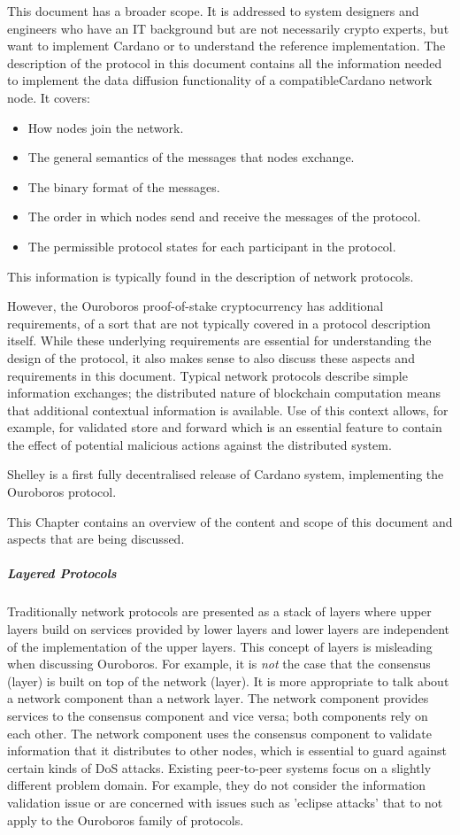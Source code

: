 \documentclass{report}
\newcommand{\wip}[1]{\color{magenta}{#1}\color{black}}
\theoremstyle{definition}{
  \newtheorem{lemma}{Lemma}[section] %
  \newtheorem{definition}[lemma]{Definition}
}
\theoremstyle{theorem}{
  \newtheorem{invariant}[lemma]{Invariant}
  \newtheorem{proofobligation}[lemma]{Proof Obligation}
}
\numberwithin{equation}{lemma}
\begin{document}
This document has a broader scope.
It is addressed to system designers and engineers who have an IT background
but are not necessarily crypto experts,
but want to implement Cardano or to understand the reference implementation.
The description of the protocol in this document contains all the information needed to
implement the data diffusion functionality of a compatibleCardano network node.
It covers:
\begin{itemize}
\item How nodes join the network.
\item The general semantics of the messages that nodes exchange.
\item The binary format of the messages.
\item The order in which nodes send and receive the messages of the protocol.
\item The permissible protocol states for each participant in the protocol.
\end{itemize}
This information is typically found in the description of network protocols.

However, the Ouroboros proof-of-stake cryptocurrency has additional requirements,
of a sort that are not typically covered in a
protocol  description itself.
While these underlying requirements are essential for understanding the design of the protocol,
it also makes sense to also discuss these aspects and requirements in this document.
Typical network protocols describe simple information exchanges;
the distributed nature of blockchain computation means
that additional contextual information is available.
Use of this context allows, for example, for validated store and forward
which is an essential feature to contain the effect of potential malicious actions
against the distributed system.

Shelley is a first fully decentralised release of Cardano system, implementing the Ouroboros protocol.

This Chapter contains an overview of the content and scope of this document and aspects that
are being discussed.

\wip{
\subparagraph{Software assurance}
Software assurance
}

\subparagraph{Layered Protocols}
Traditionally network protocols are presented as a stack of layers where
upper layers build on services provided by lower layers and lower layers
are independent of the implementation of the upper layers.
This concept of layers is misleading when discussing Ouroboros.
For example, it is {\em not} the case that the consensus (layer)
is built on top of the network (layer).
It is more appropriate to talk about a network component than a network layer.
The network component provides services to the consensus component and vice versa;
both components rely on each other.
The network component uses the consensus component to validate
information that it distributes to other nodes, which
is essential to guard against certain kinds of DoS attacks.
Existing peer-to-peer systems focus on a slightly different problem domain.
For example, they do not consider the information validation issue
or are concerned with issues such as 'eclipse attacks' that to not
apply to the Ouroboros family of protocols.
\end{document}
